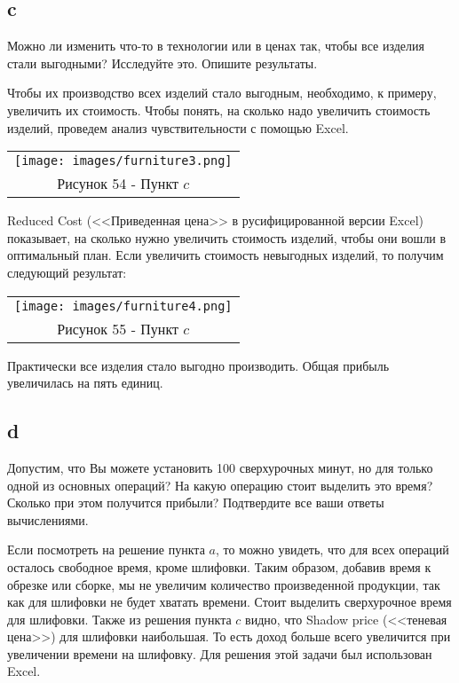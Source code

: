 \documentclass[12pt]{article}
\theoremstyle{definition}
\theoremstyle{remark}
\begin{document}
\subsection*{c}
Можно ли изменить что-то в технологии или в ценах так, чтобы все изделия стали выгодными? Исследуйте это. Опишите результаты.

Чтобы их производство всех изделий стало выгодным, необходимо, к примеру, увеличить их стоимость. Чтобы понять, на сколько надо увеличить стоимость изделий, проведем анализ чувствительности с помощью Excel.

\begin{center}
  \begin{tabular}{c}
\texttt{[image: images/furniture3.png]}\\
Рисунок 54 - Пункт $c$
\end{tabular}
\end{center}

Reduced Cost (<<Приведенная цена>> в русифицированной версии Excel) показывает, на сколько нужно увеличить стоимость изделий, чтобы они вошли в оптимальный план. Если увеличить стоимость невыгодных изделий, то получим следующий результат:

\begin{center}
  \begin{tabular}{c}
\texttt{[image: images/furniture4.png]}\\
Рисунок 55 - Пункт $c$
\end{tabular}
\end{center}

Практически все изделия стало выгодно производить. Общая прибыль увеличилась на пять единиц.
\subsection*{d}
Допустим, что Вы можете установить 100 сверхурочных минут, но для только одной из основных операций? На какую операцию стоит выделить это время? Сколько при этом получится прибыли? Подтвердите все ваши ответы вычислениями.

Если посмотреть на решение пункта $a$, то можно увидеть, что для всех операций осталось свободное время, кроме шлифовки. Таким образом, добавив время к обрезке или сборке, мы не увеличим количество произведенной продукции, так как для шлифовки не будет хватать времени. Стоит выделить сверхурочное время для шлифовки. Также из решения пункта $c$ видно, что Shadow price (<<теневая цена>>) для шлифовки наибольшая. То есть доход больше всего увеличится при увеличении времени на шлифовку. Для решения этой задачи был использован Excel.
\end{document}
